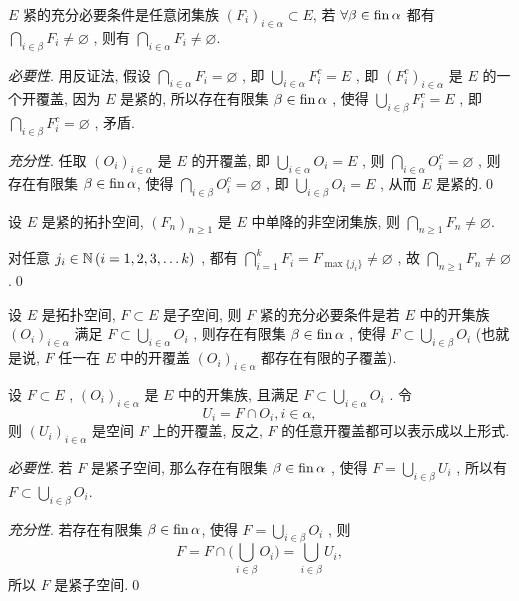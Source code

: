 \begin{Proposition}\label{prop:紧性的另一刻画}
	$ E $ 紧的充分必要条件是任意闭集族 $ (F_{i})_{i\in\alpha}\subset E $, 若 $ \forall \beta\in\operatorname{fin}\alpha $ 都有 $ \bigcap_{i\in\beta}F_{i}\neq \varnothing $ , 则有 $ \bigcap_{i\in\alpha}F_{i}\neq\varnothing $.
\end{Proposition}

\begin{Proof}
	\textsl{必要性}. 用反证法, 假设 $ \bigcap_{i\in\alpha}F_{i}=\varnothing $ , 即 $ \bigcup_{i\in\alpha}F_{i}^{c}=E $ , 即 $ (F_{i}^{c})_{i\in\alpha} $ 是 $ E $ 的一个开覆盖, 因为 $ E $ 是紧的,  所以存在有限集 $ \beta\in\operatorname{fin}\alpha $ ,  使得 $ \bigcup_{i\in\beta}F_{i}^{c}=E $ , 即 $ \bigcap_{i\in\beta}F_{i}^{c}=\varnothing $ , 矛盾.

	\textsl{充分性}. 任取 $ (O_{i})_{i\in\alpha} $ 是 $ E $ 的开覆盖, 即 $ \bigcup_{i\in\alpha}O_{i}=E $ , 则 $ \bigcap_{i\in\alpha}O_{i}^{c}=\varnothing $ , 则存在有限集 $ \beta\in\operatorname{fin} \alpha $, 使得 $ \bigcap_{i\in\beta}O_{i}^{c}=\varnothing $ , 即 $ \bigcup_{i\in\beta}O_{i}=E $ , 从而 $ E $ 是紧的.\qed
\end{Proof}

\begin{Proposition}
	设 $ E $ 是紧的拓扑空间, $ (F_{n})_{n\geqslant1} $ 是 $ E $ 中单降的非空闭集族, 则 $ \bigcap_{n\geqslant1}F_{n}\neq\varnothing $.
\end{Proposition}

\begin{Proof}
	对任意 $ j_{i}\in\mathbb{N}\,(i=1, 2, 3,\dots k) $ , 都有 $ \bigcap_{i=1}^{k}F_{i}=F_{\max\{ j_{i} \}}\neq\varnothing $ , 故 $ \bigcap_{n\geqslant1}F_{n}\neq\varnothing $ .\qed
\end{Proof}

\begin{Theorem}
	设 $ E $ 是拓扑空间,  $ F\subset E $ 是子空间, 则 $ F $ 紧的充分必要条件是若 $ E $ 中的开集族 $ (O_{i})_{i\in\alpha} $ 满足 $ F\subset \bigcup_{i\in\alpha}O_{i} $ , 则存在有限集 $ \beta\in\operatorname{fin}\alpha $ , 使得 $ F\subset\bigcup_{i\in\beta}O_{i} $ (也就是说, $ F $ 任一在 $ E $ 中的开覆盖 $ (O_{i})_{i\in\alpha} $ 都存在有限的子覆盖).
\end{Theorem}

\begin{Proof}
	设 $ F\subset E $ , $ (O_{i})_{i\in\alpha} $ 是 $ E $ 中的开集族, 且满足 $ F\subset \bigcup_{i\in\alpha}O_{i} $ . 令
	\[
		U_{i}=F\cap O_{i}, i\in\alpha,
	\]
	则 $ (U_{i})_{i\in\alpha} $ 是空间 $ F $ 上的开覆盖, 反之,  $ F $ 的任意开覆盖都可以表示成以上形式.

	\textsl{必要性}. 若 $ F $ 是紧子空间, 那么存在有限集 $ \beta\in\operatorname{fin}\alpha $ , 使得 $ F=\bigcup_{i\in\beta}U_{i} $ , 所以有 $ F\subset\bigcup_{i\in\beta}O_{i} $.

	\textsl{充分性}. 若存在有限集 $ \beta\in\operatorname{fin}\alpha $, 使得 $ F=\bigcup_{i\in\beta}O_{i} $ , 则
	\[
		F=F\cap\bigg( \bigcup_{i\in\beta}O_{i} \bigg)=\bigcup_{i\in\beta}U_{i},
	\]
	所以 $ F $ 是紧子空间.\qed
\end{Proof}

